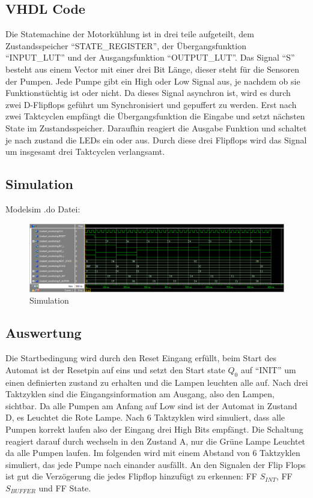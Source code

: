 \subsection{VHDL Code}
 Die Statemachine der Motorkühlung ist in drei teile aufgeteilt, dem Zustandsspeicher ``STATE\_REGISTER'', der Übergangsfunktion ``INPUT\_LUT'' und der Ausgangsfunktion ``OUTPUT\_LUT''. Das Signal ``S'' besteht aus einem Vector mit einer drei Bit Länge, dieser steht für die Sensoren der Pumpen. Jede Pumpe gibt ein High oder Low Signal aus, je nachdem ob sie  Funktionstüchtig ist oder nicht. Da dieses Signal  asynchron ist, wird es durch zwei D-Flipflops geführt um Synchronisiert und gepuffert zu werden. Erst nach zwei Taktcyclen empfängt die Übergangsfunktion die Eingabe und setzt nächsten State im Zustandsspeicher. Daraufhin reagiert die Ausgabe Funktion und schaltet je nach zustand die LEDs ein oder aus. Durch diese drei Flipflops wird das Signal um insgesamt drei Taktcyclen verlangsamt.
 



\subsection{Simulation}
Modelsim .do Datei:


\begin{figure}[H]
    \begin{center}
        \includegraphics[width=1\textwidth]{img/dip3_sim.png}
        \caption{Simulation}
        \label{fig:A1_sim}
    \end{center}
\end{figure}

\subsection{Auswertung}
Die Startbedingung wird durch den Reset Eingang erfüllt, beim Start des Automat ist der Resetpin auf eins und setzt den Start state $Q_0$ auf ``INIT'' um einen definierten zustand zu erhalten und die Lampen leuchten alle auf. Nach drei Taktzyklen sind die Eingangsinformation am Ausgang, also den Lampen, sichtbar. Da alle Pumpen am Anfang auf Low sind ist der Automat in Zustand D, es Leuchtet die Rote Lampe. Nach 6 Taktzyklen wird simuliert, dass alle Pumpen korrekt laufen also der Eingang drei High Bits empfängt. Die Schaltung reagiert darauf durch wechseln in den Zustand A, nur die Grüne Lampe Leuchtet da alle Pumpen laufen. Im folgenden wird mit einem Abstand von 6 Taktzyklen simuliert, das jede Pumpe nach einander ausfällt. An den Signalen der Flip Flops ist gut die Verzögerung die jedes Flipflop hinzufügt zu erkennen: FF $S_{INT}$, FF $S_{BUFFER}$ und FF State.

